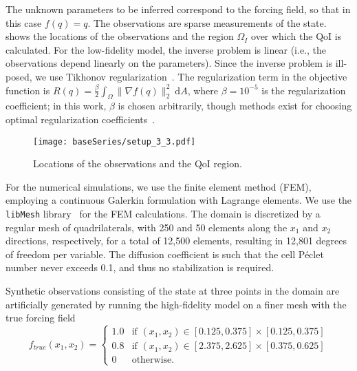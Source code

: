 The unknown parameters to be inferred correspond to the forcing field, so that in this case $f(q)=q$. The observations are sparse measurements of the state.
 shows the locations of the observations and the region $\Omega_I$ over which the QoI is calculated. For the low-fidelity model, the inverse problem is linear (i.e., the observations depend linearly on the parameters). Since the inverse problem is ill-posed, we use Tikhonov regularization~\cite{EngHanNeu00}. The regularization term in the objective function  is $R(q)=\frac{\beta}{2}\int_\Omega \|\nabla f(q)\|_2^2\:\textrm{d}A$, where $\beta=10^{-5}$ is the regularization coefficient; in this work, $\beta$ is chosen arbitrarily, though methods exist for choosing optimal regularization coefficients~\cite{BelgeKilmerMiller02,Calvetal00}.
%
\begin{figure}[htbp]
\centering
\texttt{[image: baseSeries/setup\_3\_3.pdf]}
\caption{Locations of the observations and the QoI region.}
\label{fig:baseSetup}
\end{figure}
%

For the numerical simulations, we use the finite element method (FEM), employing a continuous Galerkin formulation with Lagrange elements. We use the \texttt{libMesh} library~\cite{libMeshPaper} for the FEM calculations.
The domain is discretized by a regular mesh of quadrilaterals, with 250 and 50 elements along the $x_1$ and $x_2$ directions, respectively, for a total of 12,500 elements, resulting in 12,801 degrees of freedom per variable. The diffusion coefficient is such that the cell P\'{e}clet number never exceeds 0.1, and thus no stabilization is required.

Synthetic observations consisting of the state at three points in the domain are artificially generated by running the high-fidelity model on a finer mesh with the true forcing field
%
\begin{equation}
f_{true}(x_1,x_2)=
\begin{cases}
1.0 & \textrm{if }(x_1,x_2)\in[0.125,0.375]\times[0.125,0.375] \\
0.8 & \textrm{if }(x_1,x_2)\in[2.375,2.625]\times[0.375,0.625] \\
0 & \textrm{otherwise}.
\end{cases}
\end{equation}
%
%
